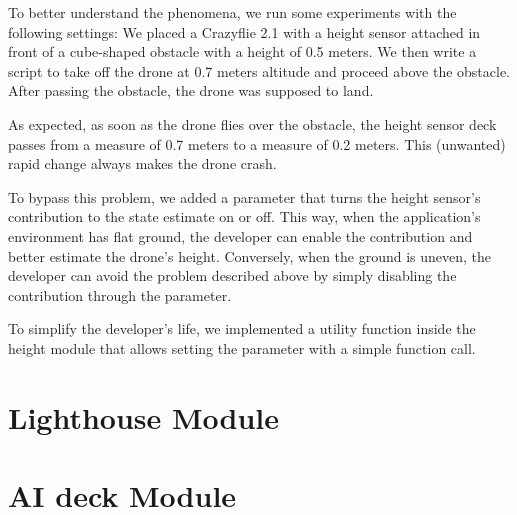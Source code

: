 To better understand the phenomena, we run some experiments with the following settings:
We placed a Crazyflie 2.1 with a height sensor attached in front of a cube-shaped obstacle with a height of 0.5 meters. 
We then write a script to take off the drone at 0.7 meters altitude and proceed above the obstacle. 
After passing the obstacle, the drone was supposed to land. 

As expected, as soon as the drone flies over the obstacle, the height sensor deck passes from a measure of 0.7 meters to a measure of 0.2 meters. 
This (unwanted) rapid change always makes the drone crash. 

To bypass this problem, we added a parameter that turns the height sensor's contribution to the state estimate on or off.
This way, when the application's environment has flat ground, the developer can enable the contribution and better estimate the drone's height.
Conversely, when the ground is uneven, the developer can avoid the problem described above by simply disabling the contribution through the parameter. 

To simplify the developer's life, we implemented a utility function inside the height module that allows setting the parameter with a simple function call. 

\section{Lighthouse Module}\label{sec:module_lighthouse}



\section{AI deck Module}\label{sec:module_ai_deck}